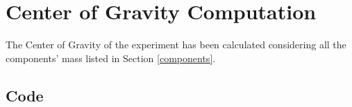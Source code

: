 

\newpage
\section{Center of Gravity Computation}



The Center of Gravity of the experiment has been calculated considering all the components' mass listed in Section \ref{components}.


\subsection{Code}










